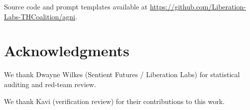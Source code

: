 \documentclass[11pt,a4paper]{article}
\begin{document}
Source code and prompt templates available at
\url{https://github.com/Liberation-Labs-THCoalition/agni}.

\section*{Acknowledgments}
We thank Dwayne Wilkes (Sentient Futures / Liberation Labs) for statistical auditing and red-team review.

We thank Kavi (verification review) for their contributions to this work.



\end{document}
